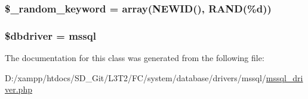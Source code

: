 \subsubsection[{\$\+\_\+random\+\_\+keyword}]{\setlength{\rightskip}{0pt plus 5cm}\$\+\_\+random\+\_\+keyword = array(\textquotesingle{}N\+E\+W\+I\+D()\textquotesingle{}, \textquotesingle{}R\+A\+N\+D(\%{\bf d})\textquotesingle{})\hspace{0.3cm}{\ttfamily [protected]}}\label{class_c_i___d_b__mssql__driver_a10213aa6e05f6d924d3277bb1d2fea00}
\hypertarget{class_c_i___d_b__mssql__driver_a0cde2a16322a023d040aa7f725877597}{}
\subsubsection[{\$dbdriver}]{\setlength{\rightskip}{0pt plus 5cm}\$dbdriver = \textquotesingle{}mssql\textquotesingle{}}\label{class_c_i___d_b__mssql__driver_a0cde2a16322a023d040aa7f725877597}


The documentation for this class was generated from the following file\+:\begin{DoxyCompactItemize}
\item 
D\+:/xampp/htdocs/\+S\+D\+\_\+\+Git/\+L3\+T2/\+F\+C/system/database/drivers/mssql/\hyperlink{mssql__driver_8php}{mssql\+\_\+driver.\+php}\end{DoxyCompactItemize}
